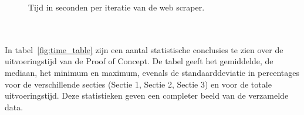 \begin{figure}[ht]
\datatable
{}
\caption{Tijd in seconden per iteratie van de web scraper.}
\label{fig:time_graph}
\end{figure}
\\ \\
In tabel~\ref{fig:time_table} zijn een aantal statistische conclusies te zien over de uitvoeringstijd van de Proof of Concept. De tabel geeft het gemiddelde, de mediaan, het minimum en maximum, evenals de standaarddeviatie in percentages voor de verschillende secties (Sectie 1, Sectie 2, Sectie 3) en voor de totale uitvoeringstijd. Deze statistieken geven een completer beeld van de verzamelde data.

